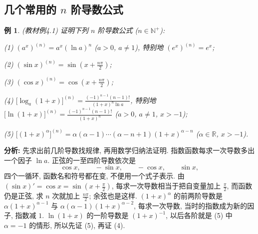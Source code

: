 \documentclass[UTF8,openany]{ctexbook}
\theoremstyle{chinesetextbook}
\newtheorem{example}{例}[section]
\begin{document}
\subsection{\texorpdfstring{几个常用的 $n$ 阶导数公式}{几个常用的 n 阶导数公式}}
\begin{example}\label{ex:c2-4-1}
\textnormal{(教材例4.1)} 证明下列 $n$ 阶导数公式 ($n\in\mathbb N^+$):

(1) $(a^x)^{(n)}=a^x(\ln a)^n$ ($a>0$, $a\ne1$), 特别地 $(e^x)^{(n)}=e^x$;

(2) $\displaystyle(\sin x)^{(n)}=\sin\left(x+\frac{n\pi}2\right)$;

(3) $\displaystyle(\cos x)^{(n)}=\cos\left(x+\frac{n\pi}2\right)$;

(4) $\displaystyle\bigl[\log_a(1+x)\bigr]^{(n)}=\frac{(-1)^{n-1}(n-1)!}{(1+x)^n\ln a}$, 特别地 $\displaystyle\bigl[\ln(1+x)\bigr]^{(n)}=\frac{(-1)^{n-1}(n-1)!}{(1+x)^n}$ ($a>0$, $a\ne1$, $x>-1$);

(5) $\bigl[(1+x)^\alpha\bigr]^{(n)}=\alpha(\alpha-1)\cdots(\alpha-n+1)(1+x)^{\alpha-n}$ ($\alpha\in\mathbb R$, $x>-1$).
\end{example}
\par\indent\textbf{分析:} 先求出前几阶导数找规律, 再用数学归纳法证明. 指数函数每求一次导数多出一个因子 $\ln a$. 正弦的一至四阶导数依次是
\[
\cos x,\qquad-\sin x,\qquad-\cos x,\qquad\sin x,
\]
四个一循环, 函数名和符号都在变, 不便用一个式子表示. 由 $\displaystyle(\sin x)'=\cos x=\sin\left(x+\frac\pi2\right)$, 每求一次导数相当于把自变量加上 $\displaystyle\frac\pi2$, 而函数仍是正弦, 求 $n$ 次就加上 $\displaystyle\frac{n\pi}2$; 余弦也是这样. $(1+x)^\alpha$ 的前两阶导数是 $\alpha(1+x)^{\alpha-1}$ 与 $\alpha(\alpha-1)(1+x)^{\alpha-2}$, 每求一次导数, 当时的指数成为新的因子, 指数减 $1$. $\ln(1+x)$ 的一阶导数是 $(1+x)^{-1}$, 以后各阶就是 (5) 中 $\alpha=-1$ 的情形, 所以先证 (5), 再证 (4).
\end{document}
